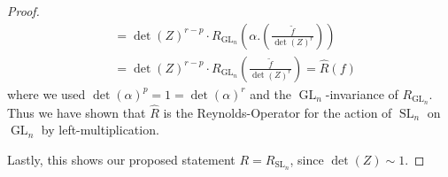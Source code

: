 \begin{proof}
\begin{equation}
\begin{aligned}
      &= \operatorname{det} (Z)^{r-p} \cdot R_{\operatorname{GL}_n} \left( \alpha . \left( \frac{ \tilde{f} }{ \operatorname{det} (Z)^r } \right) \right) \\
      &= \operatorname{det} (Z)^{r-p} \cdot R_{\operatorname{GL}_n} \left( \frac{ \tilde{f} }{ \operatorname{det} (Z)^r } \right)
      = \hat{R} (f)
    \end{aligned}
  \end{equation}
  where we used $ \operatorname{det} (\alpha)^p = 1 = \operatorname{det} (\alpha)^r $ and the $\operatorname{GL}_n$-invariance of $R_{\operatorname{GL}_n}$.
  Thus we have shown that $\hat{R}$ is the Reynolds-Operator for the action of $\operatorname{SL}_n$ on $\operatorname{GL}_n$ by left-multiplication.

  Lastly, this shows our proposed statement $ R = R_{\operatorname{SL}_n} $, since $ \operatorname{det} (Z) \sim 1 $.
\end{proof}

